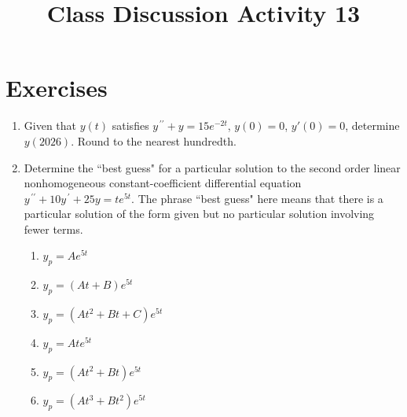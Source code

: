 \documentclass{ximera}
\begin{document}
\begin{abstract}
 \end{abstract}

    \title{Class Discussion Activity 13}
    
    \maketitle

\section*{Exercises}


\begin{enumerate}[label=(\arabic*)]

\item Given that $y(t)$ satisfies $y^{\,\prime\prime}+y=15e^{-2t}$, $y(0)=0$, $y'(0)=0$, determine $y(2026)$.  Round to the nearest hundredth.












\item Determine the ``best guess" for a particular solution to the second order linear nonhomogeneous constant-coefficient differential equation \\$y^{\,\prime\prime}+10y^{\,\prime}+25y=te^{5t}$.  The phrase ``best guess" here means that there is a particular solution of the form given but no particular solution involving fewer terms.

\begin{enumerate}[label=(\alph*)]
\item $y_p=Ae^{5t}$
\item $y_p=(At+B)e^{5t}$  %
\item $y_p=(At^2+Bt+C)e^{5t}$
\item $y_p=Ate^{5t}$
\item $y_p=(At^2+Bt)e^{5t}$ 
\item $y_p=(At^3+Bt^2)e^{5t}$ 
\end{enumerate}


\end{enumerate}
\end{document}
